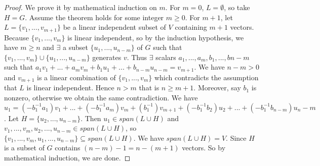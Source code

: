 \begin{proof}
	We prove it by mathematical induction on $m$. For $m=0$, $L = \emptyset$, so take $H=G$. Assume the theorem holds for some integer $m \geq 0$. For $ m+1 $, let $L = \{ v_1,...,v_{m+1} \}$ be a linear independent subset of $V$ containing $m+1$ vectors. Because $\{v_1,...,v_m\}$ is linear independent, so by the induction  hypothesis, we have $m \geq n$ and $\exists$ a subset $\{u_1,...,u_{n-m}\}$ of $G$ such that $\{v_1,...,v_m\} \cup \{u_1,...,u_{n-m}\}$  generates $v$. Thus $\exists$ scalars $a_1,...,a_m,b_1,...,b{n-m}$ such that $a_1v_1+...+a_mv_m+b_1u_1+...+b_{n-m}u_{n-m}=v_{m+1}$. We have $n-m>0$ and $v_{m+1}$ is a linear combination of $\{v_1,...,v_m\}$ which contradicts the assumption that $L$ is linear independent. Hence $n>m$ that is $n \geq m+1$. Moreover, say $b_1$ is nonzero, otherwise we obtain the same contradiction. We have $u_1 = (-b_1^{-1}a_1)v_1+...+(-b_1^{-1}a_m)v_m+(b_1^{-1})v_{m+1}+(-b_1^{-1}b_2)u_2+...+(-b_1^{-1}b_{n-m})u_n-m$. Let $H = \{u_2,...,u_{n-m}\}$. Then $u_1 \in span(L \cup H)$ and $v_1,...,v_m,u_2,...,u_{n-m} \in span(L \cup H)$, so $ \{v_1,...,v_m,u_1,...,u_{n-m} \} \subseteq span(L \cup H)$.  We have $span(L \cup H)=V$. Since $H$ is a subset of $G$  contains $(n-m)-1=n-(m+1)$ vectors. So by mathematical induction, we are done.
\end{proof}